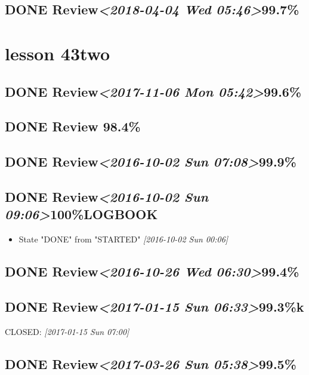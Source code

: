 \documentclass[11pt]{ctexart}
\begin{document}
\subsection{{\bfseries\sffamily DONE} Review\textit{<2018-04-04 Wed 05:46>}99.7\%}
\label{sec:org20beb00}
\section{lesson 43two}
\label{sec:org6a3cf1c}
\subsection{{\bfseries\sffamily DONE} Review\textit{<2017-11-06 Mon 05:42>}99.6\%}
\label{sec:org5983cb2}
\subsection{{\bfseries\sffamily DONE} Review 98.4\%}
\label{sec:orgf5197f9}
\subsection{{\bfseries\sffamily DONE} Review\textit{<2016-10-02 Sun 07:08>}99.9\%}
\label{sec:orgcf03553}
\subsection{{\bfseries\sffamily DONE} Review\textit{<2016-10-02 Sun 09:06>}100\%\hfill{}\textsc{LOGBOOK}}
\label{sec:org6ff9c42}
\begin{itemize}
\item State "DONE"       from "STARTED"    \textit{[2016-10-02 Sun 00:06]}
\end{itemize}

\subsection{{\bfseries\sffamily DONE} Review\textit{<2016-10-26 Wed 06:30>}99.4\%}
\label{sec:orgef04f65}
\subsection{{\bfseries\sffamily DONE} Review\textit{<2017-01-15 Sun 06:33>}99.3\%k}
\label{sec:orga03bb4f}

CLOSED: \textit{[2017-01-15 Sun 07:00]}
\subsection{{\bfseries\sffamily DONE} Review\textit{<2017-03-26 Sun 05:38>}99.5\%}
\label{sec:org3802fd9}
\end{document}
